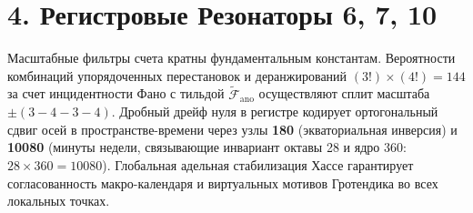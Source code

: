 \documentclass[10pt,twocolumn]{article}
\begin{document}
\section*{4. Регистровые Резонаторы 6, 7, 10}
Масштабные фильтры счета кратны фундаментальным константам. Вероятности комбинаций упорядоченных перестановок и деранжирований $(3!) \times (4!) = 144$ за счет инцидентности Фано с тильдой $\tilde{\mathcal{F}}_{\text{ano}}$ осуществляют сплит масштаба $\pm(3-4-3-4)$. Дробный дрейф нуля в регистре кодирует ортогональный сдвиг осей в пространстве-времени через узлы \textbf{180} (экваториальная инверсия) и \textbf{10080} (минуты недели, связывающие инвариант октавы 28 и ядро 360: $28 \times 360 = 10080$). Глобальная адельная стабилизация Хассе гарантирует согласованность макро-календаря и виртуальных мотивов Гротендика во всех локальных точках.
\end{document}
